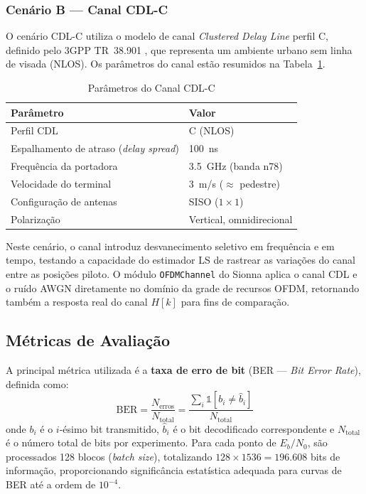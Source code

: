 \documentclass[conference]{IEEEtran}
\begin{document}
\subsubsection{Cenário B --- Canal CDL-C}

O cenário CDL-C utiliza o modelo de canal \textit{Clustered Delay Line} perfil C, definido pelo 3GPP TR~38.901 \cite{3gpp38901}, que representa um ambiente urbano sem linha de visada (NLOS). Os parâmetros do canal estão resumidos na Tabela~\ref{tab:params_cdl}.

\begin{table}[htbp]
\centering
\caption{Parâmetros do Canal CDL-C}
\label{tab:params_cdl}
\begin{tabular}{@{}ll@{}}
\toprule
\textbf{Parâmetro} & \textbf{Valor} \\
\midrule
Perfil CDL & C (NLOS) \\
Espalhamento de atraso (\textit{delay spread}) & 100~ns \\
Frequência da portadora & 3.5~GHz (banda n78) \\
Velocidade do terminal & 3~m/s ($\approx$ pedestre) \\
Configuração de antenas & SISO ($1 \times 1$) \\
Polarização & Vertical, omnidirecional \\
\bottomrule
\end{tabular}
\end{table}

Neste cenário, o canal introduz desvanecimento seletivo em frequência e em tempo, testando a capacidade do estimador LS de rastrear as variações do canal entre as posições piloto. O módulo \texttt{OFDMChannel} do Sionna aplica o canal CDL e o ruído AWGN diretamente no domínio da grade de recursos OFDM, retornando também a resposta real do canal $H[k]$ para fins de comparação.

\subsection{Métricas de Avaliação}

A principal métrica utilizada é a \textbf{taxa de erro de bit} (BER --- \textit{Bit Error Rate}), definida como:
\begin{equation}
    \text{BER} = \frac{N_{\text{erros}}}{N_{\text{total}}} = \frac{\sum_{i} \mathbb{1}[b_i \neq \hat{b}_i]}{N_{\text{total}}}
    \label{eq:ber_def}
\end{equation}
onde $b_i$ é o $i$-ésimo bit transmitido, $\hat{b}_i$ é o bit decodificado correspondente e $N_{\text{total}}$ é o número total de bits por experimento. Para cada ponto de $E_b/N_0$, são processados 128 blocos (\textit{batch size}), totalizando $128 \times 1536 = 196{.}608$ bits de informação, proporcionando significância estatística adequada para curvas de BER até a ordem de $10^{-4}$.
\end{document}
